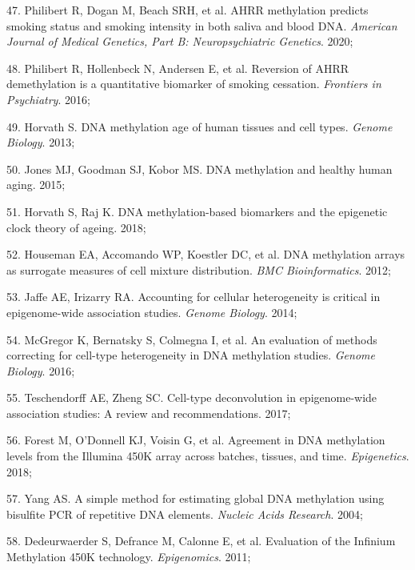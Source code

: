 \documentclass[11pt,twoside]{bristolthesis}
\newenvironment{cslreferences}%
  {}%
  {\par}
\begin{document}
\begin{cslreferences}
\leavevmode\hypertarget{ref-Philibert2020}{}%
47. Philibert R, Dogan M, Beach SRH, et al. AHRR methylation predicts smoking status and smoking intensity in both saliva and blood DNA. \emph{American Journal of Medical Genetics, Part B: Neuropsychiatric Genetics}. 2020;

\leavevmode\hypertarget{ref-Philibert2016}{}%
48. Philibert R, Hollenbeck N, Andersen E, et al. Reversion of AHRR demethylation is a quantitative biomarker of smoking cessation. \emph{Frontiers in Psychiatry}. 2016;

\leavevmode\hypertarget{ref-Horvath2013}{}%
49. Horvath S. DNA methylation age of human tissues and cell types. \emph{Genome Biology}. 2013;

\leavevmode\hypertarget{ref-Jones2015}{}%
50. Jones MJ, Goodman SJ, Kobor MS. DNA methylation and healthy human aging. 2015;

\leavevmode\hypertarget{ref-Horvath2018}{}%
51. Horvath S, Raj K. DNA methylation-based biomarkers and the epigenetic clock theory of ageing. 2018;

\leavevmode\hypertarget{ref-Houseman2012}{}%
52. Houseman EA, Accomando WP, Koestler DC, et al. DNA methylation arrays as surrogate measures of cell mixture distribution. \emph{BMC Bioinformatics}. 2012;

\leavevmode\hypertarget{ref-Jaffe2014}{}%
53. Jaffe AE, Irizarry RA. Accounting for cellular heterogeneity is critical in epigenome-wide association studies. \emph{Genome Biology}. 2014;

\leavevmode\hypertarget{ref-McGregor2016}{}%
54. McGregor K, Bernatsky S, Colmegna I, et al. An evaluation of methods correcting for cell-type heterogeneity in DNA methylation studies. \emph{Genome Biology}. 2016;

\leavevmode\hypertarget{ref-Teschendorff2017}{}%
55. Teschendorff AE, Zheng SC. Cell-type deconvolution in epigenome-wide association studies: A review and recommendations. 2017;

\leavevmode\hypertarget{ref-Forest2018}{}%
56. Forest M, O'Donnell KJ, Voisin G, et al. Agreement in DNA methylation levels from the Illumina 450K array across batches, tissues, and time. \emph{Epigenetics}. 2018;

\leavevmode\hypertarget{ref-Yang2004}{}%
57. Yang AS. A simple method for estimating global DNA methylation using bisulfite PCR of repetitive DNA elements. \emph{Nucleic Acids Research}. 2004;

\leavevmode\hypertarget{ref-Dedeurwaerder2011}{}%
58. Dedeurwaerder S, Defrance M, Calonne E, et al. Evaluation of the Infinium Methylation 450K technology. \emph{Epigenomics}. 2011;


\end{cslreferences}
\end{document}
